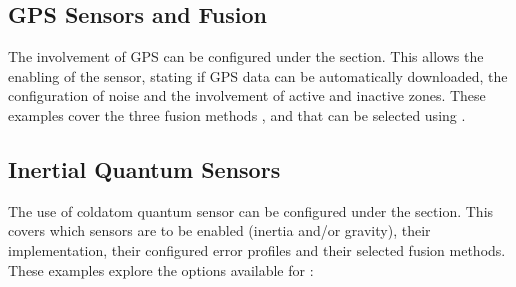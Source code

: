 \documentclass[letterpaper,10pt,english]{sphinxmanual}
\begin{document}
\subsection{GPS Sensors and Fusion}
\label{\detokenize{usage/tutorials:gps-sensors-and-fusion}}
\sphinxAtStartPar
The involvement of GPS can be configured under the  section. This allows the enabling of the sensor, stating if
GPS data can be automatically downloaded, the configuration of noise and the involvement of active and inactive zones.
These examples cover the three fusion methods ,  and  that can be selected using
.

\begin{sphinxVerbatim}[commandchars=\\\{\}]
\end{sphinxVerbatim}


\subsection{Inertial Quantum Sensors}
\label{\detokenize{usage/tutorials:inertial-quantum-sensors}}
\sphinxAtStartPar
The use of cold\sphinxhyphen{}atom quantum sensor can be configured under the  section. This covers which sensors are
to be enabled (inertia and/or gravity), their implementation, their configured error profiles and their selected
fusion methods. These examples explore the options available for :
\end{document}
